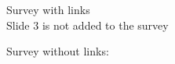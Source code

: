 \documentclass[a4paper,\myClassOptions]{article}
\begin{document}
\Huge
Survey with links\\
Slide 3 is not added to the survey




\null\vfill\centerline{\scalebox{6}{Slide 1}}\vfill\AddToSurvey\newpage
\null\vfill\centerline{\scalebox{6}{Slide 2}}\vfill\AddToSurvey\newpage
\null\vfill\centerline{\scalebox{6}{Slide 3}}\vfill\newpage
\null\vfill\centerline{\scalebox{6}{Slide 4}}\vfill\AddToSurvey\newpage
\null\vfill\centerline{\scalebox{6}{Slide 5}}\vfill\AddToSurvey\newpage
\null\vfill\centerline{\scalebox{6}{Slide 6}}\vfill\AddToSurvey\newpage

Survey without links:

\end{document}
